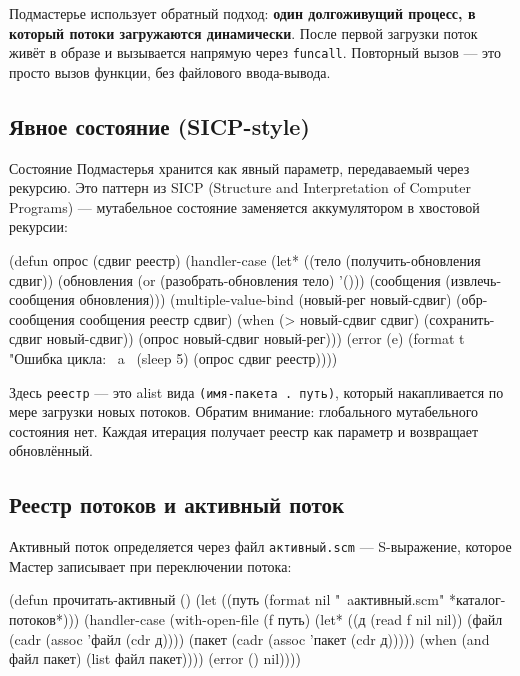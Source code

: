 \documentclass[11pt,a4paper]{article}
\begin{document}
Подмастерье использует обратный подход: \textbf{один долгоживущий процесс, в который потоки загружаются динамически}. После первой загрузки поток живёт в образе и вызывается напрямую через \texttt{funcall}. Повторный вызов — это просто вызов функции, без файлового ввода-вывода.

\subsection{Явное состояние (SICP-style)}

Состояние Подмастерья хранится как явный параметр, передаваемый через рекурсию. Это паттерн из SICP (Structure and Interpretation of Computer Programs) — мутабельное состояние заменяется аккумулятором в хвостовой рекурсии:

\begin{lispcode}[caption={подмастерье/main.lisp — рекурсивный цикл с явным состоянием}]
(defun опрос (сдвиг реестр)
  (handler-case
      (let* ((тело       (получить-обновления сдвиг))
             (обновления (or (разобрать-обновления тело) '()))
             (сообщения  (извлечь-сообщения обновления)))
        (multiple-value-bind (новый-рег новый-сдвиг)
            (обр-сообщения сообщения реестр сдвиг)
          (when (> новый-сдвиг сдвиг)
            (сохранить-сдвиг новый-сдвиг))
          (опрос новый-сдвиг новый-рег)))
    (error (e)
      (format t "Ошибка цикла: ~a~%
      (sleep 5)
      (опрос сдвиг реестр))))
\end{lispcode}

Здесь \texttt{реестр} — это alist вида \texttt{(имя-пакета . путь)}, который накапливается по мере загрузки новых потоков. Обратим внимание: глобального мутабельного состояния нет. Каждая итерация получает реестр как параметр и возвращает обновлённый.

\subsection{Реестр потоков и активный поток}

Активный поток определяется через файл \texttt{активный.scm} — S-выражение, которое Мастер записывает при переключении потока:

\begin{lispcode}[caption={подмастерье/main.lisp — чтение активного потока}]
(defun прочитать-активный ()
  (let ((путь (format nil "~aактивный.scm" *каталог-потоков*)))
    (handler-case
        (with-open-file (f путь)
          (let* ((д     (read f nil nil))
                 (файл  (cadr (assoc 'файл  (cdr д))))
                 (пакет (cadr (assoc 'пакет (cdr д)))))
            (when (and файл пакет)
              (list файл пакет))))
      (error () nil))))
\end{lispcode}
\end{document}
